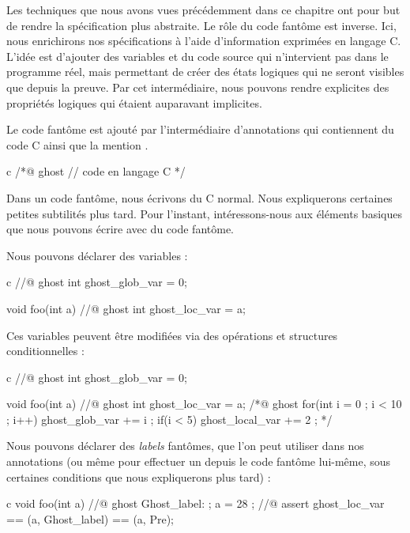 Les techniques que nous avons vues précédemment dans ce chapitre ont pour but de
rendre la spécification plus abstraite. Le rôle du code fantôme est inverse. Ici,
nous enrichirons nos spécifications à l'aide d'information exprimées
en langage C. L'idée est d'ajouter des variables et du code source qui
n'intervient pas dans le programme réel, mais permettant de créer des états
logiques qui ne seront visibles que depuis la preuve. Par cet intermédiaire,
nous pouvons rendre explicites des propriétés logiques qui étaient auparavant
implicites.




Le code fantôme est ajouté par l'intermédiaire d'annotations qui contiennent
du code C ainsi que la mention .



\begin{CodeBlock}{c}
/*@
  ghost
  // code en langage C
*/
\end{CodeBlock}


Dans un code fantôme, nous écrivons du C normal. Nous expliquerons certaines
petites subtilités plus tard. Pour l'instant, intéressons-nous aux éléments
basiques que nous pouvons écrire avec du code fantôme.


Nous pouvons déclarer des variables :


\begin{CodeBlock}{c}
//@ ghost int ghost_glob_var = 0;

void foo(int a){
  //@ ghost int ghost_loc_var = a;
}
\end{CodeBlock}


Ces variables peuvent être modifiées via des opérations et structures
conditionnelles :


\begin{CodeBlock}{c}
//@ ghost int ghost_glob_var = 0;

void foo(int a){
  //@ ghost int ghost_loc_var = a;
  /*@ ghost
    for(int i = 0 ; i < 10 ; i++){
      ghost_glob_var += i ;
      if(i < 5) ghost_local_var += 2 ;
    }
  */
}
\end{CodeBlock}


Nous pouvons déclarer des \textit{labels} fantômes, que l'on peut utiliser dans
nos annotations (ou même pour effectuer un  depuis le code
fantôme lui-même, sous certaines conditions que nous expliquerons plus tard) :


\begin{CodeBlock}{c}
void foo(int a){
  //@ ghost Ghost_label: ;
  a = 28 ;
  //@ assert ghost_loc_var == \at(a, Ghost_label) == \at(a, Pre);
}
\end{CodeBlock}


